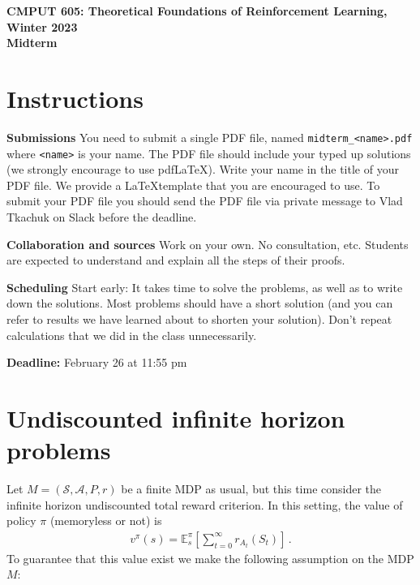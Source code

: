 \documentclass{article}
\DeclareMathOperator*{\1}{\mathbbm{1}}
\newcommand{\E}{\mathbb E}
\theoremstyle{definition}
\theoremstyle{remark}
\newcommand{\cS}{\mathcal{S}}
\newcommand{\cA}{\mathcal{A}}
\begin{document}
\begin{center}
{\Large \textbf{CMPUT 605: Theoretical Foundations of Reinforcement Learning, Winter 2023\\ Midterm}}
\end{center}

\section*{Instructions}
\noindent \textbf{Submissions}
You need to submit a single PDF file, named {\tt midterm\_<name>.pdf} where {\tt <name>} is your name.
The PDF file should include your typed up solutions (we strongly encourage to use pdf\LaTeX). 
Write your name in the title of your PDF file.
We provide a \LaTeX template that you are encouraged to use.
To submit your PDF file you should send the PDF file via private message to Vlad Tkachuk on Slack before the deadline.

\noindent \textbf{Collaboration and sources}
Work on your own. No consultation, etc.
Students are expected to understand and explain all the steps of their proofs.

\noindent \textbf{Scheduling}
Start early: It takes time to solve the problems, as well as to write down the solutions. Most problems should have a short solution (and you can refer to results we have learned about to shorten your solution). Don't repeat calculations that we did in the class unnecessarily.

\vspace{0.3cm}

\noindent \textbf{Deadline:} February 26 at 11:55 pm

\newcommand{\cM}{\mathcal{M}}
\newcommand{\nS}{\mathrm{S}}
\newcommand{\nA}{\mathrm{A}}
\newcommand{\PP}{\mathbb{P}}
\newcommand{\RR}{\mathbb{R}}
\newcommand{\ip}[1]{\langle #1 \rangle}

\section*{Undiscounted infinite horizon problems}


Let $M = (\cS,\cA,P,r)$ be a finite MDP as usual, but this time consider the infinite horizon undiscounted total reward criterion. In this setting, the value of policy $\pi$ (memoryless or not) is
\begin{align*}
v^\pi(s) = \E^{\pi}_s\left[ \sum_{t=0}^\infty r_{A_t}(S_t) \right]\,.
\end{align*}
To guarantee that this value exist we make the following assumption on the MDP $M$:
\end{document}
